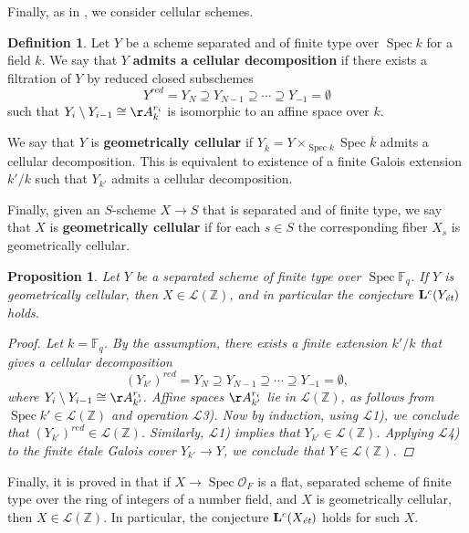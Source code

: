 \documentclass[leqno,12pt]{article}
\theoremstyle{plain}
\newtheorem{proposition}[theorem]{\indent\sc Proposition}
\theoremstyle{definition}
\newtheorem{definition}[theorem]{\indent\sc Definition}
\DeclareMathOperator{\Spec}{Spec}
\newcommand{\ZZ}{\mathbb{Z}}
\newcommand{\FF}{\mathbb{F}}
\newcommand{\et}{\text{\it \'{e}t}}
\begin{document}
Finally, as in \cite[\S 5.4]{Morin-2014}, we consider cellular schemes.

\begin{definition}
  Let $Y$ be a scheme separated and of finite type over $\Spec k$ for a field
  $k$. We say that $Y$ \textbf{admits a cellular decomposition} if there exists
  a filtration of $Y$ by reduced closed subschemes
  $$Y^{red} = Y_N \supseteq Y_{N-1} \supseteq \cdots \supseteq Y_{-1} = \emptyset$$
  such that $Y_i\setminus Y_{i-1} \cong \AA^{r_i}_k$ is isomorphic to an affine
  space over $k$.

  We say that $Y$ is \textbf{geometrically cellular} if
  $Y_{\overline{k}} = Y \times_{\Spec k} \Spec \overline{k}$ admits a cellular
  decomposition. This is equivalent to existence of a finite Galois extension
  $k'/k$ such that $Y_{k'}$ admits a cellular decomposition.

  Finally, given an $S$-scheme $X \to S$ that is separated and of finite type,
  we say that $X$ is \textbf{geometrically cellular} if for each $s \in S$ the
  corresponding fiber $X_s$ is geometrically cellular.
\end{definition}

\begin{proposition}
  Let $Y$ be a separated scheme of finite type over $\Spec \FF_q$.
  If $Y$ is geometrically cellular, then $X \in \mathcal{L} (\ZZ)$,
  and in particular the conjecture $\mathbf{L}^c (Y_\et)$ holds.

  \begin{proof}
    Let $k = \FF_q$. By the assumption, there exists a finite extension $k'/k$
    that gives a cellular decomposition
    $$(Y_{k'})^{red} = Y_N \supseteq Y_{N-1} \supseteq \cdots \supseteq Y_{-1} = \emptyset,$$
    where $Y_i \setminus Y_{i-1} \cong \AA^{r_i}_{k'}$. Affine spaces
    $\AA^{r_i}_{k'}$ lie in $\mathcal{L} (\ZZ)$, as follows from
    $\Spec k' \in \mathcal{L} (\ZZ)$ and operation $\mathcal{L}$3). Now by
    induction, using $\mathcal{L}$1), we conclude that
    $(Y_{k'})^{red} \in \mathcal{L} (\ZZ)$. Similarly, $\mathcal{L}$1) implies
    that $Y_{k'} \in \mathcal{L} (\ZZ)$. Applying $\mathcal{L}$4) to the finite
    \'{e}tale Galois cover $Y_{k'} \to Y$, we conclude that
    $Y \in \mathcal{L} (\ZZ)$.
  \end{proof}
\end{proposition}

Finally, it is proved in \cite[Proposition~5.14]{Morin-2014} that if
$X \to \Spec \mathcal{O}_F$ is a flat, separated scheme of finite type over the
ring of integers of a number field, and $X$ is geometrically cellular, then
$X \in \mathcal{L} (\ZZ)$. In particular, the conjecture $\mathbf{L}^c (X_\et)$
holds for such $X$.
\end{document}
